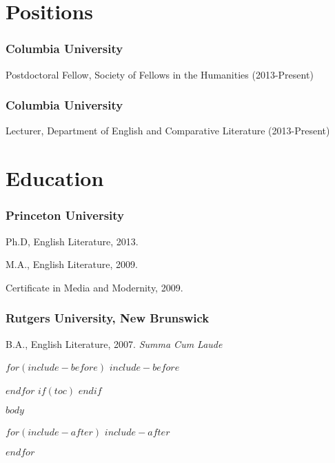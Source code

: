 \documentclass[11pt]{article}
\begin{document}
\bigskip\bigskip\medskip
{}
\reversemarginpar
\bigskip 

\section{Positions}

\subsubsection{Columbia University}
Postdoctoral Fellow, Society of Fellows in the Humanities (2013-Present)

\smallskip

\subsubsection{Columbia University}
Lecturer, Department of English and Comparative Literature (2013-Present)

\medskip

\section{Education}

\subsubsection{Princeton University}

Ph.D, English Literature, 2013.
 
\smallskip

M.A., English Literature, 2009.

\smallskip

Certificate in Media and Modernity, 2009. %

\medskip

\subsubsection{Rutgers University, New Brunswick}

B.A., English Literature, 2007. \emph{Summa Cum Laude} %

$for(include-before)$
$include-before$

$endfor$
$if(toc)$
\tableofcontents
$endif$

$body$

$for(include-after)$
$include-after$

$endfor$
\end{document}
